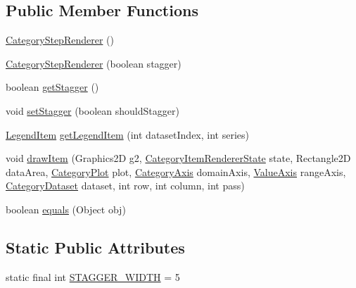 \subsection*{Public Member Functions}
\begin{DoxyCompactItemize}
\item 
\mbox{\hyperlink{classorg_1_1jfree_1_1chart_1_1renderer_1_1category_1_1_category_step_renderer_ac1c44bbc5a49616c45fd71263aa670a6}{Category\+Step\+Renderer}} ()
\item 
\mbox{\hyperlink{classorg_1_1jfree_1_1chart_1_1renderer_1_1category_1_1_category_step_renderer_af88859f39d93f57529e1f2113e5dd152}{Category\+Step\+Renderer}} (boolean stagger)
\item 
boolean \mbox{\hyperlink{classorg_1_1jfree_1_1chart_1_1renderer_1_1category_1_1_category_step_renderer_ae84e3b11eb3555721e6b3fc599fd5100}{get\+Stagger}} ()
\item 
void \mbox{\hyperlink{classorg_1_1jfree_1_1chart_1_1renderer_1_1category_1_1_category_step_renderer_a7941b24c1af92c9afa2c9000512f1d0f}{set\+Stagger}} (boolean should\+Stagger)
\item 
\mbox{\hyperlink{classorg_1_1jfree_1_1chart_1_1_legend_item}{Legend\+Item}} \mbox{\hyperlink{classorg_1_1jfree_1_1chart_1_1renderer_1_1category_1_1_category_step_renderer_ae7db1212606a6f3db9eee52486a6623f}{get\+Legend\+Item}} (int dataset\+Index, int series)
\item 
void \mbox{\hyperlink{classorg_1_1jfree_1_1chart_1_1renderer_1_1category_1_1_category_step_renderer_aa2758ff5fa3b549e15cfb428a24c68ec}{draw\+Item}} (Graphics2D g2, \mbox{\hyperlink{classorg_1_1jfree_1_1chart_1_1renderer_1_1category_1_1_category_item_renderer_state}{Category\+Item\+Renderer\+State}} state, Rectangle2D data\+Area, \mbox{\hyperlink{classorg_1_1jfree_1_1chart_1_1plot_1_1_category_plot}{Category\+Plot}} plot, \mbox{\hyperlink{classorg_1_1jfree_1_1chart_1_1axis_1_1_category_axis}{Category\+Axis}} domain\+Axis, \mbox{\hyperlink{classorg_1_1jfree_1_1chart_1_1axis_1_1_value_axis}{Value\+Axis}} range\+Axis, \mbox{\hyperlink{interfaceorg_1_1jfree_1_1data_1_1category_1_1_category_dataset}{Category\+Dataset}} dataset, int row, int column, int pass)
\item 
boolean \mbox{\hyperlink{classorg_1_1jfree_1_1chart_1_1renderer_1_1category_1_1_category_step_renderer_a75c675a4d4cef7ac374e971afe5b4127}{equals}} (Object obj)
\end{DoxyCompactItemize}
\subsection*{Static Public Attributes}
\begin{DoxyCompactItemize}
\item 
static final int \mbox{\hyperlink{classorg_1_1jfree_1_1chart_1_1renderer_1_1category_1_1_category_step_renderer_afd9fd5be8438db1c2fd4c13b6c60ffa1}{S\+T\+A\+G\+G\+E\+R\+\_\+\+W\+I\+D\+TH}} = 5
\end{DoxyCompactItemize}
